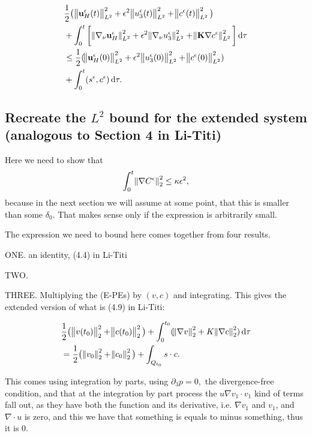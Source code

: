 \documentclass[11pt]{article}
\newcommand*\diff{\mathop{}\!\mathrm{d}}
\begin{document}
\begin{equation}
  \begin{split}  
    & \frac{1}{2} \big (\norm{\mathbf{u}_H^\epsilon (t)}_{L^2}^2 + \epsilon ^ 2 \norm{u_3^\epsilon (t)}_{L^2}^2 + \norm{c^\epsilon (t)}_{L^2}^2 \big ) \\
    & + \int_0 ^ t \bigg [\norm{\nabla_\nu \mathbf{u}_H^\epsilon}_{L^2}^2 + \epsilon ^ 2 \norm{\nabla_\nu u_3^\epsilon}_{L^2}^2 + \norm{ \mathbf{K} \nabla c^\epsilon}_{L^2}^2\bigg ] \diff \tau \\
    & \leq \frac{1}{2} (\norm{\mathbf{u}_H^\epsilon (0)}_{L^2}^2 + \epsilon ^ 2 \norm{u_3^\epsilon (0)}_{L^2}^2 + \norm{c^\epsilon (0)}_{L^2}^2) \\
    & + \int_0^t (s^\epsilon,c^\epsilon) \diff \tau. \label{WeakSolEnergyInequality}
  \end{split}
\end{equation}  

\subsection{Recreate the $L^2$ bound for the extended system (analogous to Section 4 in Li-Titi)}

Here we need to show that $$ \int_0^t \norm{\nabla C^\epsilon}_2^2 \leq \kappa \epsilon^2,$$ because in the next section we will assume at some point, that this is smaller than some $\delta_0.$ That makes sense only if the expression is arbitrarily small.

The expression we need to bound here comes together from four results.

ONE. an identity, (4.4) in Li-Titi

TWO.

THREE. Multiplying the (E-PEs) by $(v,c)$ and integrating. This gives the extended version of what is (4.9) in Li-Titi:

\begin{equation}
  \begin{split}
    & \frac{1}{2} \big ( \norm{v(t_0)}_2^2 + \norm{c(t_0)}_2^2 \big) + \int_0^{t_0} ( \norm{\nabla v}_2^2 + K \norm{\nabla c}_2^2 ) \diff \tau \\
    & = \frac{1}{2} \big ( \norm{v_0}_2^2 + \norm{c_0}_2^2 \big) + \int_{Q_{t_0}} s \cdot c.
  \end{split}
\end{equation}

This comes using integration by parts, using $\partial_3 p = 0,$ the divergence-free condition, and that at the integration by part process the $u \nabla v_1 \cdot v_1$ kind of terms fall out, as they have both the function and its derivative, i.e. $\nabla v_1$ and $v_1$, and $\nabla \cdot u$ is zero, and this we have that something is equals to minus something, thus it is 0.
\end{document}

